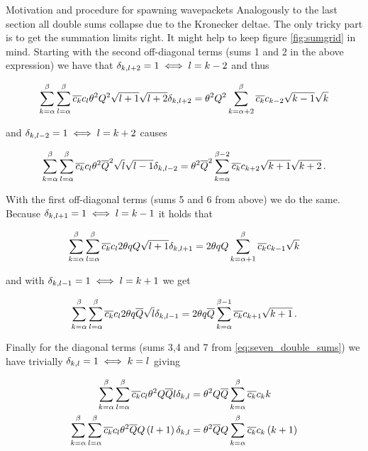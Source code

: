\begin{chapter}{Motivation and procedure for spawning wavepackets}
Analogously to the last section all double sums collapse due to the Kronecker deltae.
The only tricky part is to get the summation limits right. It might help to keep
figure \ref{fig:sumgrid} in mind. Starting with the second off-diagonal terms (sums
1 and 2 in the above expression) we have that $\delta_{k,l+2} = 1 \iff l=k-2$ and thus

\begin{equation} \label{eq:seven_double_sums_1}
  \sum_{k=\alpha}^\beta \sum_{l=\alpha}^\beta \overline{c_k} c_l \theta^2 Q^2 \sqrt{l+1} \sqrt{l+2} \delta_{k,l+2}
  = \theta^2 Q^2 \sum_{k=\alpha+2}^\beta \overline{c_k} c_{k-2} \sqrt{k-1} \sqrt{k}
\end{equation}

and $\delta_{k,l-2} = 1 \iff l=k+2$ causes

\begin{equation} \label{eq:seven_double_sums_2}
  \sum_{k=\alpha}^\beta \sum_{l=\alpha}^\beta \overline{c_k} c_l \theta^2 \overline{Q}^2 \sqrt{l} \sqrt{l-1} \delta_{k,l-2}
  = \theta^2 \overline{Q}^2 \sum_{k=\alpha}^{\beta-2} \overline{c_k} c_{k+2} \sqrt{k+1}\sqrt{k+2} \,.
\end{equation}

With the first off-diagonal terms (sums 5 and 6 from above) we do the same. Because
$\delta_{k,l+1} = 1 \iff l=k-1$ it holds that

\begin{equation} \label{eq:seven_double_sums_5}
  \sum_{k=\alpha}^\beta \sum_{l=\alpha}^\beta \overline{c_k} c_l 2\theta qQ \sqrt{l+1} \delta_{k,l+1}
  = 2\theta qQ \sum_{k=\alpha+1}^\beta \overline{c_k} c_{k-1} \sqrt{k}
\end{equation}

and with $\delta_{k,l-1} = 1 \iff l=k+1$ we get

\begin{equation} \label{eq:seven_double_sums_6}
  \sum_{k=\alpha}^\beta \sum_{l=\alpha}^\beta \overline{c_k} c_l 2\theta q\overline{Q} \sqrt{l} \delta_{k,l-1}
  = 2\theta q\overline{Q} \sum_{k=\alpha}^{\beta-1} \overline{c_k} c_{k+1} \sqrt{k+1} \,.
\end{equation}

Finally for the diagonal terms (sums 3,4 and 7 from \eqref{eq:seven_double_sums})
we have trivially $\delta_{k,l} = 1 \iff k=l$ giving

\begin{equation} \label{eq:seven_double_sums_34}
\begin{split}
  \sum_{k=\alpha}^\beta \sum_{l=\alpha}^\beta \overline{c_k} c_l \theta^2 Q\overline{Q} l \delta_{k,l}
  & = \theta^2 Q\overline{Q} \sum_{k=\alpha}^\beta \overline{c_k} c_k k \\
  \sum_{k=\alpha}^\beta \sum_{l=\alpha}^\beta \overline{c_k} c_l \theta^2 \overline{Q}Q \left(l+1\right) \delta_{k,l}
  & = \theta^2 \overline{Q}Q \sum_{k=\alpha}^\beta \overline{c_k} c_k \left(k+1\right)
\end{split}
\end{equation}


\end{chapter}
